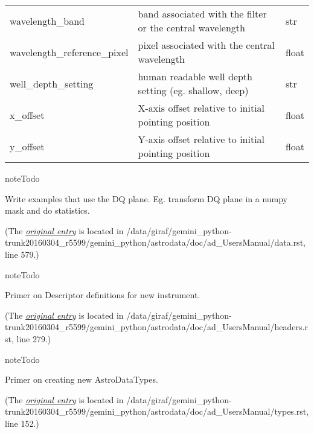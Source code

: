 \documentclass[letterpaper,10pt,english]{sphinxmanual}
\begin{document}
\begin{longtable}{|l|p{3.0in}|l|}
wavelength\_band
 & 
band associated with the filter or the central wavelength
 & 
str
\\

wavelength\_reference\_pixel
 & 
pixel associated with the central wavelength
 & 
float
\\

well\_depth\_setting
 & 
human readable well depth setting (eg. shallow, deep)
 & 
str
\\

x\_offset
 & 
X-axis offset relative to initial pointing position
 & 
float
\\

y\_offset
 & 
Y-axis offset relative to initial pointing position
 & 
float
\\
\hline\end{longtable}


\begin{notice}{note}{Todo}

Write examples that use the DQ plane.  Eg. transform DQ plane in a numpy
mask and do statistics.
\end{notice}

(The {\hyperref[data:index-0]{\emph{original entry}}} is located in  /data/giraf/gemini\_python-trunk20160304\_r5599/gemini\_python/astrodata/doc/ad\_UsersManual/data.rst, line 579.)

\begin{notice}{note}{Todo}

Primer on Descriptor definitions for new instrument.
\end{notice}

(The {\hyperref[headers:index-0]{\emph{original entry}}} is located in  /data/giraf/gemini\_python-trunk20160304\_r5599/gemini\_python/astrodata/doc/ad\_UsersManual/headers.rst, line 279.)

\begin{notice}{note}{Todo}

Primer on creating new AstroDataTypes.
\end{notice}

(The {\hyperref[types:index-0]{\emph{original entry}}} is located in  /data/giraf/gemini\_python-trunk20160304\_r5599/gemini\_python/astrodata/doc/ad\_UsersManual/types.rst, line 152.)



\renewcommand{\indexname}{Index}
\printindex
\end{document}
